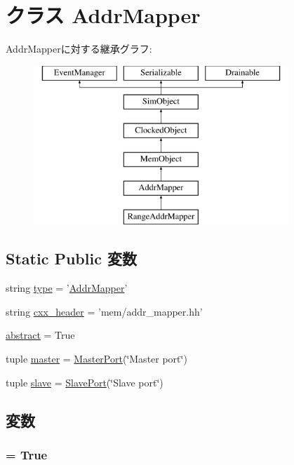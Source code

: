\hypertarget{classAddrMapper_1_1AddrMapper}{
\section{クラス AddrMapper}
\label{classAddrMapper_1_1AddrMapper}
}
AddrMapperに対する継承グラフ:\begin{figure}[H]
\begin{center}
\leavevmode
\includegraphics[height=6cm]{classAddrMapper_1_1AddrMapper}
\end{center}
\end{figure}
\subsection*{Static Public 変数}
\begin{DoxyCompactItemize}
\item 
string \hyperlink{classAddrMapper_1_1AddrMapper_acce15679d830831b0bbe8ebc2a60b2ca}{type} = '\hyperlink{classAddrMapper_1_1AddrMapper}{AddrMapper}'
\item 
string \hyperlink{classAddrMapper_1_1AddrMapper_a17da7064bc5c518791f0c891eff05fda}{cxx\_\-header} = 'mem/addr\_\-mapper.hh'
\item 
\hyperlink{classAddrMapper_1_1AddrMapper_a17fa61ac3806b481cafee5593b55e5d0}{abstract} = True
\item 
tuple \hyperlink{classAddrMapper_1_1AddrMapper_a0f74d64e6817f0f89bafc52ff3c56cbb}{master} = \hyperlink{classMasterPort}{MasterPort}(\char`\"{}Master port\char`\"{})
\item 
tuple \hyperlink{classAddrMapper_1_1AddrMapper_a9b8cb1f697e86858437a78f041478c9b}{slave} = \hyperlink{classSlavePort}{SlavePort}(\char`\"{}Slave port\char`\"{})
\end{DoxyCompactItemize}


\subsection{変数}
\hypertarget{classAddrMapper_1_1AddrMapper_a17fa61ac3806b481cafee5593b55e5d0}{
\subsubsection[{abstract}]{ = True}}
\label{classAddrMapper_1_1AddrMapper_a17fa61ac3806b481cafee5593b55e5d0}


